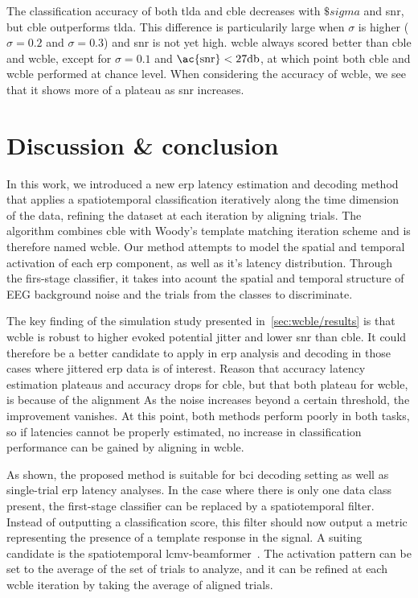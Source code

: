 The classification accuracy of both \ac{tlda} and \ac{cble} decreases with
$\$sigma$ and \ac{snr}, but \ac{cble} outperforms \ac{tlda}.
This difference is particularily large when $\sigma$ is higher ($\sigma=0.2$
and $\sigma=0.3$) and \ac{snr} is not yet high.
\Ac{wcble} always scored better than \ac{cble} and \ac{wcble}, except for
$\sigma=0.1$ and $\text{\ac{snr}} <27\text{db}$, at which point both \ac{cble}
and \ac{wcble} performed at chance level.
When considering the accuracy of \ac{wcble}, we see that it shows more of a
plateau as \ac{snr} increases.


\section{Discussion \& conclusion}
In this work, we introduced a new \ac{erp} latency estimation and decoding
method that applies a spatiotemporal classification iteratively along the time
dimension of the data, refining the dataset at each iteration by aligning
trials.
The algorithm combines \acf{cble} with Woody's template matching iteration
scheme and is therefore named \acf{wcble}.
Our method attempts to model the spatial and temporal activation of
each \ac{erp} component, as well as it's latency distribution.
Through the firs-stage classifier, it takes into acount the
spatial and temporal structure of EEG background noise and the trials from the
classes to discriminate.

The key finding of the simulation study presented
in~\ref{sec:wcble/results} is that \ac{wcble} is robust to higher evoked
potential jitter and lower \ac{snr} than \ac{cble}.
It could therefore be a better candidate to apply in \ac{erp} analysis and
decoding in those cases where jittered \ac{erp} data is of interest.
Reason that accuracy latency estimation plateaus and accuracy drops for cble,
but that both plateau for wcble, is because of the alignment
As  the noise increases beyond a certain threshold, the improvement vanishes.
At this point, both methods perform poorly in both tasks, so if latencies
cannot be properly estimated, no increase in classification performance can be
gained by aligning in \ac{wcble}.

As shown, the proposed method is suitable for \ac{bci} decoding setting
as well as single-trial \ac{erp} latency analyses.
In the case where there is only one data class present, the first-stage
classifier can be replaced by a spatiotemporal filter.
Instead of outputting a classification score, this filter should now output a
metric representing the presence of a template response in the signal.
A suiting candidate is the spatiotemporal
\ac{lcmv}-beamformer~\cite{VanVliet2015}.
The activation pattern can be set to the average of the set of trials to
analyze, and it can be refined at each \ac{wcble} iteration by taking the
average of aligned trials.

